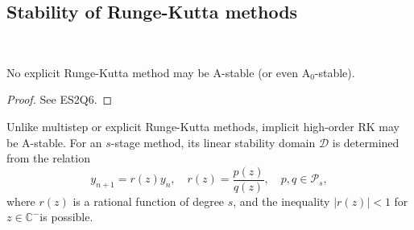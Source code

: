 \documentclass[a4paper]{article}
\begin{document}
\subsection{Stability of Runge-Kutta methods}
\ \vspace*{-1.5em}
\begin{lemma}
    No explicit Runge-Kutta method may be A-stable (or even $\text{A}_0$-stable).
\end{lemma}

\begin{proof}
    See ES2Q6. 
\end{proof}

Unlike multistep or explicit Runge-Kutta methods, implicit high-order RK may be A-stable. For an $s$-stage method, its linear stability domain $\mathcal{D}$ is determined from the relation
\[
y_{n+1}=r(z) y_n, \quad r(z)=\frac{p(z)}{q(z)}, \quad p, q \in \mathcal{P}_s,
\]
where $r(z)$ is a rational function of degree $s$, and the inequality $|r(z)|<1$ for $z \in \mathbb{C}^{-}$is possible.
\end{document}
